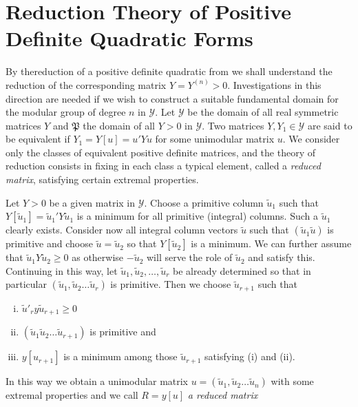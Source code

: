  \chapter{Reduction Theory of Positive Definite Quadratic Forms}%
 
 By the\pageoriginale reduction of a positive definite quadratic from
 we shall 
 understand the reduction of the corresponding matrix $Y = Y^{(n)}
 > 0$. Investigations in this direction are needed if we wish to
 construct a suitable fundamental domain for the modular group of
 degree $n$ in $\mathscr{Y}$. Let $\mathscr{Y}$ be the
 domain of all real symmetric matrices $Y $ and $\mathfrak{P}$ the
 domain of all $Y > 0$ in $\mathscr{Y}$. Two matrices $Y, Y_1
 \in \mathscr{Y}$ are said to be equivalent if $Y_1 = Y [u] =
 u' Y u$ for some unimodular matrix $u$. We consider only the classes
 of equivalent positive definite matrices, and the theory of reduction
 consists in fixing in each class a typical element, called a
 \textit{reduced matrix}, satisfying certain extremal properties.  
 
 Let $Y >0$ be a given matrix in $\mathscr{Y}$. Choose a primitive
 column $\tilde{u}_1$ such that $Y [\tilde{u}_1] = \tilde{u}_1' Y
 \tilde{u}_1$ is a minimum for all primitive (integral) columns. Such
 a $\tilde{u}_1$ clearly exists. Consider now all integral column
 vectors $\tilde{u}$ such that $(\tilde{u}_1 \tilde{u})$  is primitive
 and choose $\tilde{u}= \tilde{u}_2$ so that $ Y [\tilde{u}_2]$ is a
 minimum. We can further assume that $\tilde{u}_1 Y \tilde{u}_2 \ge 0$
 as otherwise $- \tilde{u}_2$ will serve the role of $\tilde{u}_2$ and
 satisfy this. Continuing in this way, let
 $\tilde{u}_1,\tilde{u}_2,\ldots, \tilde{u}_r$  be already determined
 so that in particular $ (\tilde{u}_1,\tilde{u}_2 \dots \tilde{u}_r)$
 is primitive. Then we choose $\tilde{u}_{r+1}$ such that  
 \begin{enumerate}[i)]
\item $\tilde{u}'_r y \tilde{u}_{r+1} \ge 0$

\item $(\tilde{u}_1 \tilde{u}_2 \dots \tilde{u}_{r+1})$ is primitive
  and  

\item $y [u_{r+1}]$ is a minimum among those $\tilde{u}_{r+1}$
  satisfying (i) and (ii). 
 \end{enumerate} 
 
 In this way we obtain a unimodular matrix $u= (\tilde{u}_1,
 \tilde{u}_2 \dots \tilde{u}_n)$ with some extremal properties and we
 call $R = y[u]$ \textit{a reduced matrix} 
 
